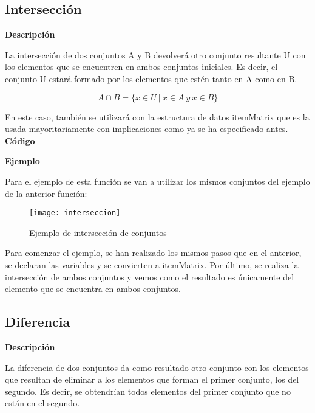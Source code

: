 \subsection{Intersecci\'on}

    \textbf{Descripci\'on}
    
    La intersecci\'on de dos conjuntos A y B devolver\'a otro conjunto resultante U con los elementos 
    que se encuentren en ambos conjuntos iniciales. Es decir, el conjunto U estar\'a formado por los elementos 
    que est\'en tanto en A como en B.

    \[
        A \cap B = \{x\in U ~ | ~ x\in A ~ y ~ x\in B \}
    \]

    En este caso, tambi\'en se utilizar\'a con la estructura de datos itemMatrix que es la usada mayoritariamente con implicaciones 
    como ya se ha especificado antes.
    \\


    \textbf{C\'odigo}

    
    \clearpage

    \textbf{Ejemplo}

    Para el ejemplo de esta funci\'on se van a utilizar los mismos conjuntos del ejemplo de la anterior funci\'on:

    \begin{figure}[H]
        \centering
        \texttt{[image: interseccion]}
        \caption{Ejemplo de intersecci\'on de conjuntos}
        \label{fig:interseccion}
    \end{figure}

    Para comenzar el ejemplo, se han realizado los mismos pasos que en el anterior, se declaran las variables y se convierten a 
    itemMatrix. 
    Por \'ultimo, se realiza la intersecci\'on de ambos conjuntos y vemos como el resultado es \'unicamente del elemento que se encuentra 
    en ambos conjuntos.

    \clearpage

\subsection{Diferencia}

    \textbf{Descripci\'on}

    La diferencia de dos conjuntos da como resultado otro conjunto con los elementos que resultan de 
    eliminar a los elementos que forman el primer conjunto, los del segundo. Es decir, se obtendr\'ian 
    todos elementos del primer conjunto que no est\'an en el segundo.

